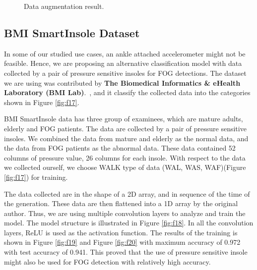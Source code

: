 \documentclass[10pt,twocolumn,letterpaper]{article}
\begin{document}
\begin{figure}[t]
    \centering
    \caption{Data augmentation result.}
    \label{fig:f16}
\end{figure}

\subsection{BMI SmartInsole Dataset}
\label{sec:additional dataset}

    In some of our studied use cases, an ankle attached accelerometer might not be feasible. Hence, we are proposing an alternative classification model with data collected by a pair of pressure sensitive insoles for FOG detections. The dataset we are using was contributed by \textbf{The Biomedical Informatics \& eHealth Laboratory (BMI Lab)}.~\cite{smartinsole2021}, and it classify the collected data into the categories shown in Figure \ref{fig:f17}.

    BMI SmartInsole data has three group of examinees, which are mature adults, elderly and FOG patients. The data are collected by a pair of pressure sensitive insoles. We combined the data from mature and elderly as the normal data, and the data from FOG patients as the abnormal data. These data contained 52 columns of pressure value, 26 columns for each insole. With respect to the data we collected ourself, we choose WALK type of data (WAL, WAS, WAF)(Figure \ref{fig:f17}) for training.

    The data collected are in the shape of a 2D array, and in sequence of the time of the generation. These data are then flattened into a 1D array by the original author. Thus, we are using multiple convolution layers to analyze and train the model. The model structure is illustrated in Figure \ref{fig:f18}. In all the convolution layers, ReLU is used as the activation function. The results of the training is shown in Figure \ref{fig:f19} and Figure \ref{fig:f20} with maximum accuracy of 0.972 with test accuracy of 0.941. This proved that the use of pressure sensitive insole might also be used for FOG detection with relatively high accuracy.
\end{document}
